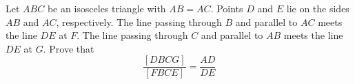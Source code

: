 Let $ABC$ be an isosceles triangle with $AB=AC$. Points $D$ and $E$ lie on the sides $AB$ and $AC$,  respectively. The line passing through $B$ and parallel to $AC$ meets the line $DE$ at $F$. The line passing through $C$ and parallel to $AB$ meets the line $DE$ at $G$. Prove that\[\frac{[DBCG]}{[FBCE]}=\frac{AD}{DE} \]